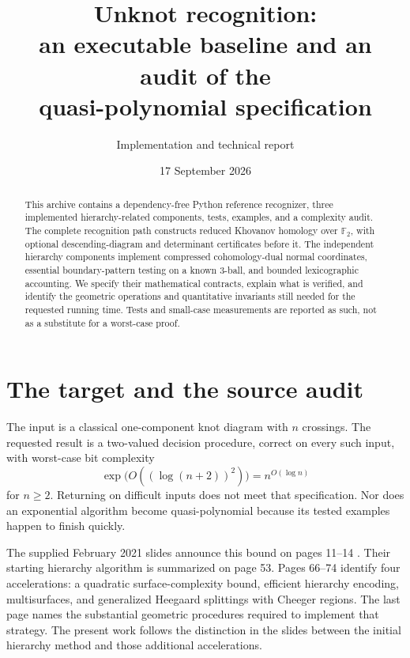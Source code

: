 \documentclass[11pt]{article}
\title{Unknot recognition:\\an executable baseline and an audit of the\\quasi-polynomial specification}
\author{Implementation and technical report}
\date{17 September 2026}
\theoremstyle{remark}\newtheorem{remark}[theorem]{Remark}
\newcommand{\F}{\mathbb F_2}
\newcommand{\code}[1]{\texttt{\detokenize{#1}}}
\begin{document}
\maketitle
\begin{center}
\end{center}
\begin{abstract}
This archive contains a dependency-free Python reference recognizer, three
implemented hierarchy-related components, tests, examples, and a complexity
audit. The complete recognition path constructs reduced Khovanov homology over
$\F$, with optional descending-diagram and determinant certificates before it.
The independent hierarchy components implement compressed cohomology-dual
normal coordinates, essential boundary-pattern testing on a known 3-ball, and
bounded lexicographic accounting. We specify their mathematical contracts,
explain what is verified, and identify the geometric operations and quantitative
invariants still needed for the requested running time. Tests and small-case
measurements are reported as such, not as a substitute for a worst-case proof.
\end{abstract}

\section{The target and the source audit}
The input is a classical one-component knot diagram with $n$ crossings. The
requested result is a two-valued decision procedure, correct on every such
input, with worst-case bit complexity
\[
 \exp\bigl(O((\log(n+2))^2)\bigr)=n^{O(\log n)}
\]
for $n\ge2$. Returning \code{unknown} on difficult inputs does not meet that
specification. Nor does an exponential algorithm become quasi-polynomial
because its tested examples happen to finish quickly.

The supplied February 2021 slides announce this bound on pages 11--14
\cite{slides}. Their starting hierarchy algorithm is summarized on page 53.
Pages 66--74 identify four accelerations: a quadratic surface-complexity bound,
efficient hierarchy encoding, multisurfaces, and generalized Heegaard splittings
with Cheeger regions. The last page names the substantial geometric procedures
required to implement that strategy. The present work follows the distinction
in the slides between the initial hierarchy method and those additional
accelerations.
\end{document}
